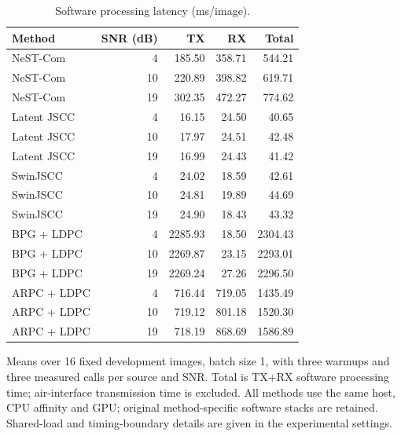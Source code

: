 \begin{table}[t]
\centering
\caption{Software processing latency (ms/image).}
\label{tab:software-latency}
\begingroup
\fontsize{8.5}{10}\selectfont
\setlength{\tabcolsep}{3pt}
\begin{tabular}{@{}lr rrr@{}}
\toprule
Method & SNR (dB) & TX & RX & Total \\
\midrule
NeST-Com & 4 & 185.50 & 358.71 & 544.21 \\
NeST-Com & 10 & 220.89 & 398.82 & 619.71 \\
NeST-Com & 19 & 302.35 & 472.27 & 774.62 \\
\addlinespace[2pt]
Latent JSCC & 4 & 16.15 & 24.50 & 40.65 \\
Latent JSCC & 10 & 17.97 & 24.51 & 42.48 \\
Latent JSCC & 19 & 16.99 & 24.43 & 41.42 \\
\addlinespace[2pt]
SwinJSCC & 4 & 24.02 & 18.59 & 42.61 \\
SwinJSCC & 10 & 24.81 & 19.89 & 44.69 \\
SwinJSCC & 19 & 24.90 & 18.43 & 43.32 \\
\addlinespace[2pt]
BPG + LDPC & 4 & 2285.93 & 18.50 & 2304.43 \\
BPG + LDPC & 10 & 2269.87 & 23.15 & 2293.01 \\
BPG + LDPC & 19 & 2269.24 & 27.26 & 2296.50 \\
\addlinespace[2pt]
ARPC + LDPC & 4 & 716.44 & 719.05 & 1435.49 \\
ARPC + LDPC & 10 & 719.12 & 801.18 & 1520.30 \\
ARPC + LDPC & 19 & 718.19 & 868.69 & 1586.89 \\
\bottomrule
\end{tabular}
\endgroup
\par\smallskip
\begin{minipage}{\columnwidth}\fontsize{8}{9.5}\selectfont
Means over 16 fixed development images, batch size 1, with three warmups and three measured calls per source and SNR. Total is TX+RX software processing time; air-interface transmission time is excluded. All methods use the same host, CPU affinity and GPU; original method-specific software stacks are retained. Shared-load and timing-boundary details are given in the experimental settings.
\end{minipage}
\end{table}

